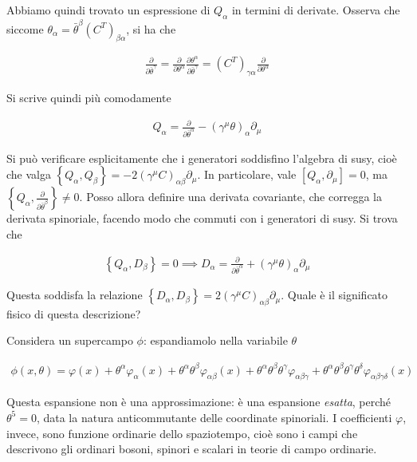 \documentclass{report}
\begin{document}
Abbiamo quindi trovato un espressione di \(Q_\alpha\) in termini di derivate. Osserva che siccome \(\theta_\alpha = \bar{\theta}^\beta (C^T)_{\beta\alpha}\), si ha che 

\begin{align}
    \frac{\partial}{\partial \bar{\theta}^\gamma} = \frac{\partial}{\partial \theta^\alpha}\frac{\partial \theta^\alpha}{\partial \bar{\theta}^\gamma} = (C^T)_{\gamma\alpha}\frac{\partial}{\partial \theta^\alpha}
\end{align}

Si scrive quindi più comodamente 

\begin{align}
    Q_\alpha = \frac{\partial}{\partial \bar{\theta}^\alpha} - (\gamma^\mu \theta)_\alpha \partial_\mu
\end{align}

Si può verificare esplicitamente che i generatori soddisfino l'algebra di susy, cioè che valga \(\left\{ Q_\alpha, Q_\beta \right\} = -2(\gamma^\mu C)_{\alpha\beta}\partial_\mu\). In particolare, vale \([Q_\alpha, \partial_\mu] = 0\), ma \(\left\{ Q_\alpha, \frac{\partial}{\partial \bar{\theta}^\beta} \right\} \neq 0\). Posso allora definire una derivata covariante, che corregga la derivata spinoriale, facendo modo che commuti con i generatori di susy. Si trova che 

\begin{align}
    \left\{ Q_\alpha, D_\beta \right\} = 0 \implies D_\alpha = \frac{\partial}{\partial \bar{\theta}^\alpha} + (\gamma^\mu \theta)_\alpha \partial_\mu
\end{align}

Questa soddisfa la relazione \(\left\{ D_\alpha, D_\beta \right\} = 2(\gamma^\mu C)_{\alpha\beta}\partial_\mu\). Quale è il significato fisico di questa descrizione? 

Considera un supercampo \(\phi\): espandiamolo nella variabile \(\theta\)

\begin{align}
    \phi(x, \theta) = \varphi(x) + \theta^\alpha \varphi_\alpha (x) + \theta^\alpha \theta^\beta \varphi_{\alpha\beta}(x) + \theta^\alpha \theta^\beta \theta^\gamma \varphi_{\alpha\beta\gamma} + \theta^\alpha \theta^\beta \theta^\gamma \theta^\delta \varphi_{\alpha\beta\gamma\delta}(x)
\end{align}

Questa espansione non è una approssimazione: è una espansione \emph{esatta}, perché \(\theta^5 =0\), data la natura anticommutante delle coordinate spinoriali. I coefficienti \(\varphi\), invece, sono funzione ordinarie dello spaziotempo, cioè sono i campi che descrivono gli ordinari bosoni, spinori e scalari in teorie di campo ordinarie. 
\end{document}
